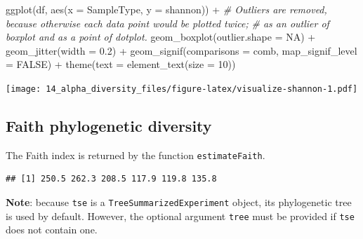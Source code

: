 \documentclass[
]{book}
\newenvironment{Shaded}{\begin{snugshade}}{\end{snugshade}}
\newcommand{\AttributeTok}[1]{\textcolor[rgb]{0.77,0.63,0.00}{#1}}
\newcommand{\CommentTok}[1]{\textcolor[rgb]{0.56,0.35,0.01}{\textit{#1}}}
\newcommand{\ConstantTok}[1]{\textcolor[rgb]{0.00,0.00,0.00}{#1}}
\newcommand{\DecValTok}[1]{\textcolor[rgb]{0.00,0.00,0.81}{#1}}
\newcommand{\FloatTok}[1]{\textcolor[rgb]{0.00,0.00,0.81}{#1}}
\newcommand{\FunctionTok}[1]{\textcolor[rgb]{0.00,0.00,0.00}{#1}}
\newcommand{\NormalTok}[1]{#1}
\newcommand{\OtherTok}[1]{\textcolor[rgb]{0.56,0.35,0.01}{#1}}
\newcommand{\SpecialCharTok}[1]{\textcolor[rgb]{0.00,0.00,0.00}{#1}}
\newcommand{\StringTok}[1]{\textcolor[rgb]{0.31,0.60,0.02}{#1}}
\begin{document}
\begin{Shaded}
\begin{Highlighting}[]
\FunctionTok{ggplot}\NormalTok{(df, }\FunctionTok{aes}\NormalTok{(}\AttributeTok{x =}\NormalTok{ SampleType, }\AttributeTok{y =}\NormalTok{ shannon)) }\SpecialCharTok{+}
  \CommentTok{\# Outliers are removed, because otherwise each data point would be plotted twice; }
  \CommentTok{\# as an outlier of boxplot and as a point of dotplot.}
  \FunctionTok{geom\_boxplot}\NormalTok{(}\AttributeTok{outlier.shape =} \ConstantTok{NA}\NormalTok{) }\SpecialCharTok{+} 
  \FunctionTok{geom\_jitter}\NormalTok{(}\AttributeTok{width =} \FloatTok{0.2}\NormalTok{) }\SpecialCharTok{+} 
  \FunctionTok{geom\_signif}\NormalTok{(}\AttributeTok{comparisons =}\NormalTok{ comb, }\AttributeTok{map\_signif\_level =} \ConstantTok{FALSE}\NormalTok{) }\SpecialCharTok{+}
  \FunctionTok{theme}\NormalTok{(}\AttributeTok{text =} \FunctionTok{element\_text}\NormalTok{(}\AttributeTok{size =} \DecValTok{10}\NormalTok{))}
\end{Highlighting}
\end{Shaded}

\texttt{[image: 14\_alpha\_diversity\_files/figure-latex/visualize-shannon-1.pdf]}

\hypertarget{faith-phylogenetic-diversity}{%
\subsection{Faith phylogenetic diversity}\label{faith-phylogenetic-diversity}}

The Faith index is returned by the function \texttt{estimateFaith}.

\begin{Shaded}
\end{Shaded}

\begin{verbatim}
## [1] 250.5 262.3 208.5 117.9 119.8 135.8
\end{verbatim}

\textbf{Note}: because \texttt{tse} is a \texttt{TreeSummarizedExperiment} object, its phylogenetic tree is used by default. However, the optional argument \texttt{tree} must be provided if \texttt{tse} does not contain one.
\end{document}
